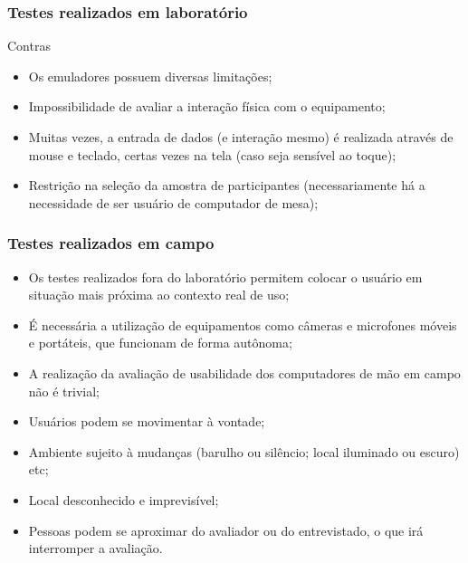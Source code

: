 \documentclass[presentation]{beamer}
\begin{document}
\begin{frame}[c]\frametitle{Testes realizados em laboratório}
    Contras
    \begin{itemize}
        \item Os emuladores possuem diversas limitações;
        \item Impossibilidade de avaliar a interação física com o equipamento;
        \item Muitas vezes, a entrada de dados (e interação mesmo) é realizada através de mouse e teclado, certas vezes na tela (caso seja sensível ao toque);
        \item Restrição na seleção da amostra de participantes (necessariamente há a necessidade de ser usuário de computador de mesa);
    \end{itemize}

\end{frame}


\begin{frame}[c]\frametitle{Testes realizados em campo}
    
    \begin{itemize}
        \item Os testes realizados fora do laboratório permitem colocar o usuário em situação mais próxima ao contexto real de uso;
        \item É necessária a utilização de equipamentos como câmeras e microfones móveis e portáteis, que funcionam de forma autônoma;
        \item A realização da avaliação de usabilidade dos computadores de mão em campo não é trivial;
        \item Usuários podem se movimentar à vontade;
        \item Ambiente sujeito à mudanças (barulho ou silêncio; local iluminado ou escuro) etc;
        \item Local desconhecido e imprevisível;
        \item Pessoas podem se aproximar do avaliador ou do entrevistado, o que irá interromper a avaliação.
    \end{itemize}

\end{frame}
\end{document}
